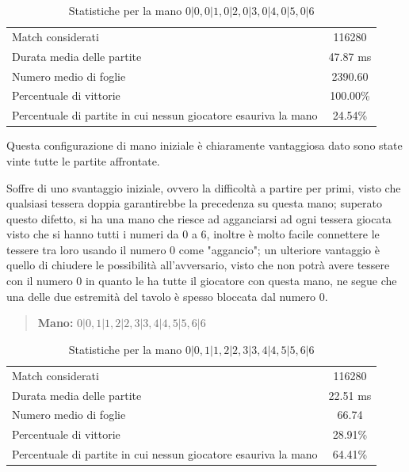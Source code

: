 \documentclass[a4paper,12pt]{report} %
\begin{document}
\begin{table}[h!]
    \centering
    \begin{tabular}{|l|c|}
        \hline
        Match considerati & 116280 \\
        Durata media delle partite & 47.87 ms \\
        Numero medio di foglie & 2390.60 \\
        Percentuale di vittorie & 100.00\% \\
        Percentuale di partite in cui nessun giocatore esauriva la mano & 24.54\% \\
        \hline
    \end{tabular}
    \caption{Statistiche per la mano \(0|0, 0|1, 0|2, 0|3, 0|4, 0|5, 0|6\)}
    \label{tab:stats_1}
\end{table}

Questa configurazione di mano iniziale è chiaramente vantaggiosa dato sono state vinte tutte le partite affrontate.

Soffre di uno svantaggio iniziale, ovvero la difficoltà a partire per primi, visto che qualsiasi tessera doppia garantirebbe la precedenza su questa mano; superato questo difetto,
si ha una mano che riesce ad agganciarsi ad ogni tessera giocata visto che si hanno tutti i numeri da 0 a 6, inoltre è molto facile connettere le tessere tra loro usando il numero 0 come "aggancio";
un ulteriore vantaggio è quello di chiudere le possibilità all'avversario, visto che non potrà avere tessere con il numero 0 in quanto le ha tutte il giocatore con questa mano, ne segue che una delle 
due estremità del tavolo è spesso bloccata dal numero 0. 


\begin{quote}
    \textbf{Mano:} \(0|0, 1|1, 2|2, 3|3, 4|4, 5|5, 6|6\)
\end{quote}

\begin{table}[h!]
    \centering
    \begin{tabular}{|l|c|}
        \hline
        Match considerati & 116280 \\
        Durata media delle partite & 22.51 ms \\
        Numero medio di foglie & 66.74 \\
        Percentuale di vittorie & 28.91\% \\
        Percentuale di partite in cui nessun giocatore esauriva la mano & 64.41\% \\
        \hline
    \end{tabular}
    \caption{Statistiche per la mano \(0|0, 1|1, 2|2, 3|3, 4|4, 5|5, 6|6\)}
    \label{tab:stats_1}
\end{table}
\end{document}
